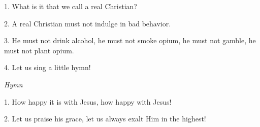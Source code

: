 \setcounter{footnote}{0}

1. What is it that we call a real Christian?

2. A real Christian must not indulge in bad behavior.

3. He must not drink alcohol, he must not smoke opium, he must not gamble, he must
not plant opium.

4. Let us sing a little hymn!

\textit{Hymn}

1. How happy it is with Jesus, how happy with Jesus!

2. Let us praise his grace, let us always exalt Him in the highest!


